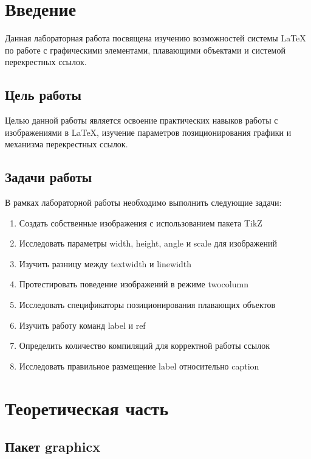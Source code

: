 \documentclass[12pt,a4paper]{article}
\begin{document}
\tableofcontents
\newpage

\section{Введение}

Данная лабораторная работа посвящена изучению возможностей системы LaTeX по работе с графическими элементами, плавающими объектами и системой перекрестных ссылок. 

\subsection{Цель работы}

Целью данной работы является освоение практических навыков работы с изображениями в LaTeX, изучение параметров позиционирования графики и механизма перекрестных ссылок.

\subsection{Задачи работы}

В рамках лабораторной работы необходимо выполнить следующие задачи:

\begin{enumerate}
    \item Создать собственные изображения с использованием пакета TikZ
    \item Исследовать параметры width, height, angle и scale для изображений
    \item Изучить разницу между textwidth и linewidth
    \item Протестировать поведение изображений в режиме twocolumn
    \item Исследовать спецификаторы позиционирования плавающих объектов
    \item Изучить работу команд label и ref
    \item Определить количество компиляций для корректной работы ссылок
    \item Исследовать правильное размещение label относительно caption
\end{enumerate}

\section{Теоретическая часть}

\subsection{Пакет graphicx}
\end{document}

